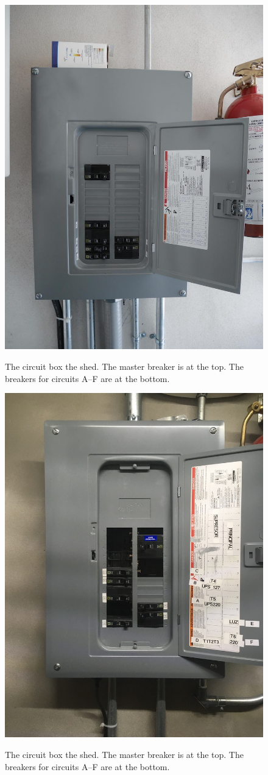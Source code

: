 \begin{figure}[t]
\ifcoatli
\begin{center}
\begin{labeled}{\includegraphics[height=0.7\linewidth]{figures/electrical-power-coatli-circuit-box.jpg}}
\end{labeled}
\end{center}
\caption{The circuit box the {\projectname} shed. The master breaker is at the top. The breakers for circuits A--F are at the bottom.}
\fi
\ifddoti
\begin{center}
\begin{labeled}{\includegraphics[width=0.45\linewidth,angle=0]{figures/electrical-power-ddoti-circuit-box.jpg}}
\end{labeled}
\end{center}
\caption{The circuit box the {\projectname} shed. The master breaker is at the top. The breakers for circuits A--F are at the bottom.}
\fi
\label{figure:circuit-box}
\end{figure}

